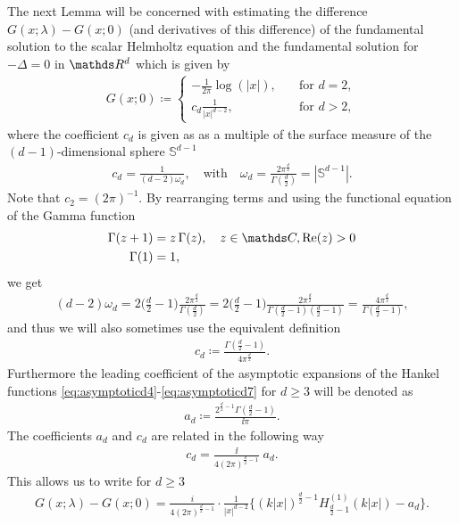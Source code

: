 The next Lemma will be concerned with estimating the difference $G(x;\lambda) - G(x; 0)$ (and derivatives of this difference) of the fundamental solution to the scalar Helmholtz equation and the fundamental solution for $-\Delta = 0$ in $\R^d$ which is given by
\begin{align}
  \label{eq:laplace}
  G(x;0) \coloneqq \begin{cases} -\frac{1}{2\pi} \log(|x|), &\quad\text{for } d = 2, \\c_d \frac{1}{|x|^{d - 2}}, &\quad\text{for } d > 2,  \end{cases}
\end{align}
where the coefficient $c_d$ is given as as a multiple of the surface measure of the $(d-1)$-dimensional sphere $\mathbb{S}^{d - 1}$
\begin{align}
  \label{eq:wd}
  c_d = \frac{1}{(d - 2) \omega_d}, \quad\text{with}\quad \omega_d = \frac{2\pi^{\frac{d}{2}}}{\Gamma(\frac{d}{2})} = |\mathbb{S}^{d - 1}|.
\end{align}
Note that $c_2 = (2 \pi)^{-1}$.
By rearranging terms and using the functional equation of the Gamma function 
\begin{align}
  \label{eq:functionalGamma}
  \begin{alignedat}{1}
    \Gamma(z + 1) &= z\, \Gamma(z), \quad z \in \C, \Re(z) > 0 \\
    \Gamma(1) &= 1,
  \end{alignedat}
\end{align}
we get
\begin{align*}
  (d - 2) \omega_d 
  = 2  \bigg( \frac{d}{2} - 1\bigg) \frac{2 \pi^{\frac{d}{2}}}{\Gamma(\frac{d}{2})}
  =  2 \bigg(\frac{d}{2} - 1\bigg) \frac{2 \pi^{\frac{d}{2}}}{\Gamma(\frac{d}{2} - 1)(\frac{d}{2} - 1)}
  = \frac{4 \pi^{\frac{d}{2}}}{\Gamma(\frac{d}{2} - 1)},
\end{align*}
and thus we will also sometimes use the equivalent definition
\begin{align}
  \label{eq:defncd}
  c_d \coloneqq \frac{\Gamma(\frac{d}{2} - 1)}{4 \pi^{\frac{d}{2}}}.
\end{align}
Furthermore the leading coefficient of the asymptotic expansions of the Hankel functions \eqref{eq:asymptoticd4}-\eqref{eq:asymptoticd7} for $d \geq 3$ will be denoted as
\begin{align}
  \label{eq:Defnad}
  a_d \coloneqq \frac{2^{\frac{d}{2} - 1} \Gamma(\frac{d}{2} - 1)}{\ii \pi}.
\end{align}
The coefficients $a_d$ and $c_d$ are related in the following way
\begin{align*}
  c_d 
  =\frac{\ii} {4 (2 \pi)^{\frac{d}{2} - 1}}\; a_d .
\end{align*}
This allows us to write for $d \geq 3$
\begin{align}
  \label{eq:HelmholtzLaplaceDifference}
  G(x;\lambda) - G(x; 0) = \frac{i}{4(2\pi)^{\frac{d}{2} - 1}} \cdot \frac{1}{|x|^{d - 2}} \Big\{ (k|x|)^{\frac{d}{2} - 1} H_{\frac{d}{2} - 1}^{(1)}(k|x|) - a_d \Big\}.
\end{align}


